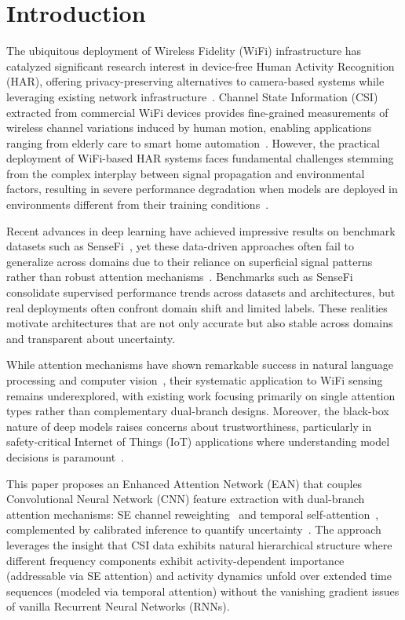 \documentclass[lettersize,journal]{IEEEtran}
\begin{document}
\section{Introduction}
The ubiquitous deployment of Wireless Fidelity (WiFi) infrastructure has catalyzed significant research interest in device-free Human Activity Recognition (HAR), offering privacy-preserving alternatives to camera-based systems while leveraging existing network infrastructure~\cite{ma2019wifi,al2017privacy}. Channel State Information (CSI) extracted from commercial WiFi devices provides fine-grained measurements of wireless channel variations induced by human motion, enabling applications ranging from elderly care to smart home automation~\cite{hassan2019survey,yousefi2017survey}. However, the practical deployment of WiFi-based HAR systems faces fundamental challenges stemming from the complex interplay between signal propagation and environmental factors, resulting in severe performance degradation when models are deployed in environments different from their training conditions~\cite{zheng2019zero,ganin2015domain}.

Recent advances in deep learning have achieved impressive results on benchmark datasets such as SenseFi~\cite{yang2023sensefi}, yet these data-driven approaches often fail to generalize across domains due to their reliance on superficial signal patterns rather than robust attention mechanisms~\cite{vaswani2017attention}. Benchmarks such as SenseFi consolidate supervised performance trends across datasets and architectures, but real deployments often confront domain shift and limited labels. These realities motivate architectures that are not only accurate but also stable across domains and transparent about uncertainty.

While attention mechanisms have shown remarkable success in natural language processing and computer vision~\cite{vaswani2017attention,se_networks2018}, their systematic application to WiFi sensing remains underexplored, with existing work focusing primarily on single attention types rather than complementary dual-branch designs. Moreover, the black-box nature of deep models raises concerns about trustworthiness, particularly in safety-critical Internet of Things (IoT) applications where understanding model decisions is paramount~\cite{ovadia2019can,calibration_guo2017}.

This paper proposes an Enhanced Attention Network (EAN) that couples Convolutional Neural Network (CNN) feature extraction with dual-branch attention mechanisms: SE channel reweighting~\cite{se_networks2018} and temporal self-attention~\cite{vaswani2017attention}, complemented by calibrated inference to quantify uncertainty~\cite{calibration_guo2017}. The approach leverages the insight that CSI data exhibits natural hierarchical structure where different frequency components exhibit activity-dependent importance (addressable via SE attention) and activity dynamics unfold over extended time sequences (modeled via temporal attention) without the vanishing gradient issues of vanilla Recurrent Neural Networks (RNNs).
\end{document}
